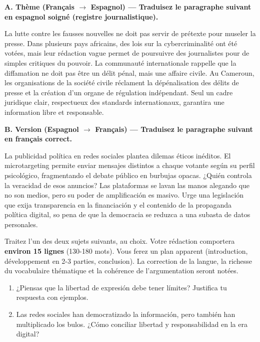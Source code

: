 \documentclass[11pt]{article}
\begin{document}
\begin{exercice}
\textbf{A. Thème (Français $\rightarrow$ Espagnol) — Traduisez le paragraphe suivant en espagnol soigné (registre journalistique).}

La lutte contre les fausses nouvelles ne doit pas servir de prétexte pour museler la presse. Dans plusieurs pays africains, des lois sur la \og cybercriminalité \fg ont été votées, mais leur rédaction vague permet de poursuivre des journalistes pour de simples critiques du pouvoir. La communauté internationale rappelle que la diffamation ne doit pas être un délit pénal, mais une affaire civile. Au Cameroun, les organisations de la société civile réclament la dépénalisation des délits de presse et la création d'un organe de régulation indépendant. Seul un cadre juridique clair, respectueux des standards internationaux, garantira une information libre et responsable.

\textbf{B. Version (Espagnol $\rightarrow$ Français) — Traduisez le paragraphe suivant en français correct.}

\begin{textebox}
La publicidad política en redes sociales plantea dilemas éticos inéditos. El microtargeting permite enviar mensajes distintos a chaque votante según su perfil psicológico, fragmentando el debate público en burbujas opacas. ¿Quién controla la veracidad de esos anuncios? Las plataformas se lavan las manos alegando que no son medios, pero su poder de amplificación es masivo. Urge una legislación que exija transparencia en la financiación y el contenido de la propaganda política digital, so pena de que la democracia se reduzca a una subasta de datos personales.
\end{textebox}
\end{exercice}

\begin{exercice}
Traitez l'un des deux sujets suivants, au choix. Votre rédaction comportera \textbf{environ 15 lignes} (130-180 mots). Vous ferez un plan apparent (introduction, développement en 2-3 parties, conclusion). La correction de la langue, la richesse du vocabulaire thématique et la cohérence de l'argumentation seront notées.

\begin{enumerate}
    \item \og ¿Piensas que la libertad de expresión debe tener límites? Justifica tu respuesta con ejemplos. \fg
    \item \og Las redes sociales han democratizado la información, pero también han multiplicado los bulos. ¿Cómo conciliar libertad y responsabilidad en la era digital? \fg
\end{enumerate}
\end{exercice}
\end{document}
